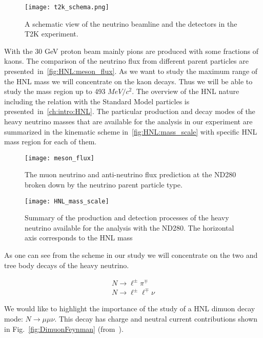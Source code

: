 \documentclass[../main.tex]{subfiles}
\begin{document}
\begin{figure}[!ht]
    \centering
    \texttt{[image: t2k\_schema.png]}
    \caption{A schematic view of the neutrino beamline and the detectors in the T2K experiment.}
    \label{fig:HNL:t2k_schema}
\end{figure}

With the 30 GeV proton beam mainly pions are produced with some fractions of kaons. The comparison of the neutrino flux from different parent particles are presented~in~\autoref{fig:HNL:meson_flux}. As we want to study the maximum range of the HNL mass we will concentrate on the kaon decays. Thus we will be able to study the mass region up to 493 $MeV/c^2$. The overview of the HNL nature including the relation with the Standard Model particles is presented~in~\autoref{ch:intro:HNL}. The particular production and decay modes of the heavy neutrino masses that are available for the analysis in our experiment are summarized in the kinematic scheme in~\autoref{fig:HNL:mass_scale} with specific HNL mass region for each of them.

\begin{figure}[!ht]
    \centering
    \texttt{[image: meson\_flux]}
    \caption{The muon neutrino and anti-neutrino flux prediction at the ND280 broken down by the neutrino parent particle type.}
    \label{fig:HNL:meson_flux}
\end{figure}

\begin{figure}[!ht]
    \centering
    \texttt{[image: HNL\_mass\_scale]}
    \caption{Summary of the production and detection processes of the heavy neutrino available for the analysis with the ND280. The horizontal axis corresponds to the HNL mass}
    \label{fig:HNL:mass_scale}
\end{figure}

As one can see from the scheme in our study we will concentrate on the two and tree body decays of the heavy neutrino.

\begin{eqnarray}
    &N\to\ell^{\pm}\pi^{\mp} &\\
    &N\to\ell^{\pm}\ell^{\mp}\nu
\end{eqnarray}

We would like to highlight the importance of the study of a HNL dimuon decay mode: $N\to\mu\mu\nu$. This decay has charge and neutral current contributions shown in Fig.~\ref{fig:DimuonFeynman} (from~\cite{Johnson1997}).
\end{document}
